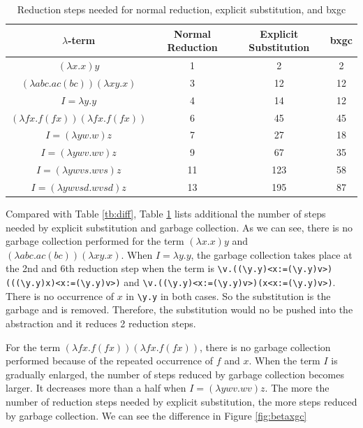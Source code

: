 \begin{table}[h!]
\centering
\begin{tabular}{|c|c|c|c|}\hline
$\lambda$-term & Normal Reduction & Explicit Substitution & bxgc\\ \hline
$(\lambda x.x)y$ & 1 & 2 & 2\\ \hline
$(\lambda abc.ac(bc))(\lambda xy.x)$ & 3 & 12 & 12\\ \hline
$I = \lambda y.y$ & 4 & 14 & 12\\ \hline
$(\lambda fx.f(fx))(\lambda fx.f(fx))$ & 6 & 45 & 45\\ \hline
$I = (\lambda yw.w)z$ & 7 & 27 & 18\\ \hline
$I = (\lambda ywv.wv)z$ & 9 & 67 & 35\\ \hline
$I = (\lambda ywvs.wvs)z$ & 11 & 123 & 58\\ \hline
$I = (\lambda ywvsd.wvsd)z$ & 13 & 195 & 87\\ \hline
\end{tabular}
\caption{Reduction steps needed for normal reduction, explicit substitution, and bxgc}
\label{tb:diffff}
\end{table}

Compared with Table \ref{tb:diff}, Table \ref{tb:diffff} lists additional the number of steps needed by explicit substitution and garbage collection. As we can see, there is no garbage collection performed for the term $(\lambda x.x)y$ and $(\lambda abc.ac(bc))(\lambda xy.x)$. When $I = \lambda y.y$, the garbage collection takes place at the 2nd and 6th reduction step when the term is \verb|\v.((\y.y)<x:=(\y.y)v>)(((\y.y)x)<x:=(\y.y)v>)| and \verb|\v.((\y.y)<x:=(\y.y)v>)(x<x:=(\y.y)v>)|. There is no occurrence of $x$ in \verb|\y.y| in both cases. So the substitution is the garbage and is removed. Therefore, the substitution would no be pushed into the abstraction and it reduces 2 reduction steps.

For the term $(\lambda fx.f(fx))(\lambda fx.f(fx))$, there is no garbage collection performed because of the repeated occurrence of $f$ and $x$. When the term $I$ is gradually enlarged, the number of steps reduced by garbage collection becomes larger. It decreases more than a half when $I = (\lambda ywv.wv)z$. The more the number of reduction steps needed by explicit substitution, the more steps reduced by garbage collection. We can see the difference in Figure \ref{fig:betaxgc}
  
